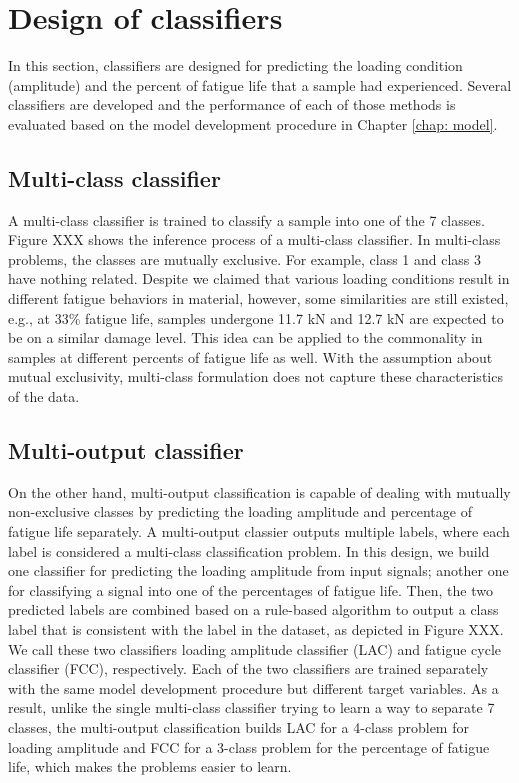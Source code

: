 \section{Design of classifiers}
\label{sec: design of classifiers}
In this section, classifiers are designed for predicting the loading condition (amplitude) and the percent of fatigue life that a sample had experienced. Several classifiers are developed and the performance of each of those methods is evaluated based on the model development procedure in Chapter \ref{chap: model}.

\subsection{Multi-class classifier}
A multi-class classifier is trained to classify a sample into one of the 7 classes. Figure XXX shows the inference process of a multi-class classifier. In multi-class problems, the classes are mutually exclusive. For example, class 1 and class 3 have nothing related. Despite we claimed that various loading conditions result in different fatigue behaviors in material, however, some similarities are still existed, e.g., at 33\% fatigue life, samples undergone 11.7 kN and 12.7 kN are expected to be on a similar damage level. This idea can be applied to the commonality in samples at different percents of fatigue life as well. With the assumption about mutual exclusivity, multi-class formulation does not capture these characteristics of the data.

\subsection{Multi-output classifier}
\label{subsec: multi-output classifier}
On the other hand, multi-output classification is capable of dealing with mutually non-exclusive classes by predicting the loading amplitude and percentage of fatigue life separately. A multi-output classier outputs multiple labels, where each label is considered a multi-class classification problem. In this design, we build one classifier for predicting the loading amplitude from input signals; another one for classifying a signal into one of the percentages of fatigue life. Then, the two predicted labels are combined based on a rule-based algorithm to output a class label that is consistent with the label in the dataset, as depicted in Figure XXX. We call these two classifiers loading amplitude classifier (LAC) and fatigue cycle classifier (FCC), respectively. Each of the two classifiers are trained separately with the same model development procedure but different target variables. As a result, unlike the single multi-class classifier trying to learn a way to separate 7 classes, the multi-output classification builds LAC for a 4-class problem for loading amplitude and FCC for a 3-class problem for the percentage of fatigue life, which makes the problems easier to learn.

